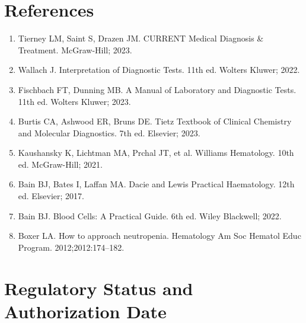 \section*{References}
\begin{enumerate}
  \item Tierney LM, Saint S, Drazen JM. CURRENT Medical Diagnosis \& Treatment. McGraw-Hill; 2023.
  \item Wallach J. Interpretation of Diagnostic Tests. 11th ed. Wolters Kluwer; 2022.
  \item Fischbach FT, Dunning MB. A Manual of Laboratory and Diagnostic Tests. 11th ed. Wolters Kluwer; 2023.
  \item Burtis CA, Ashwood ER, Bruns DE. Tietz Textbook of Clinical Chemistry and Molecular Diagnostics. 7th ed. Elsevier; 2023.
  \item Kaushansky K, Lichtman MA, Prchal JT, et al. Williams Hematology. 10th ed. McGraw-Hill; 2021.
  \item Bain BJ, Bates I, Laffan MA. Dacie and Lewis Practical Haematology. 12th ed. Elsevier; 2017.
  \item Bain BJ. Blood Cells: A Practical Guide. 6th ed. Wiley Blackwell; 2022.
  \item Boxer LA. How to approach neutropenia. Hematology Am Soc Hematol Educ Program. 2012;2012:174--182.
\end{enumerate}

\clearpage
\section*{Regulatory Status and Authorization Date}

\clearpage
